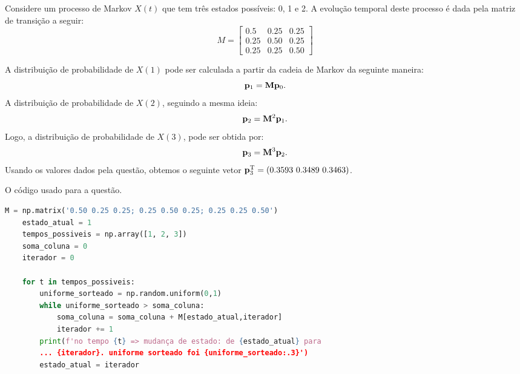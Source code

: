 \documentclass{homeworkclass}
\begin{document}
\begin{homeworkProblem}

Considere um processo de Markov $X(t)$ que tem três estados possíveis: 0, 1 e 2. A evolução temporal deste processo é dada pela matriz de transição a seguir:
\begin{equation*}
M = \begin{bmatrix}
0.5 & 0.25 & 0.25 \\
0.25 & 0.50 & 0.25 \\
0.25 & 0.25 & 0.50
\end{bmatrix}
\end{equation*}
\begin{homeworkSection}[a) Considerando que a distribuição de probabilidade de $X(0)$ é dada pelo vetor $\pbf_{0} = \left( 0.3 \, \, 0.4 \, \, 0.3 \right)^{\Trm}$, calcule a distribuição de probabilidade de $X(3)$ (ou seja, do processo de Markov no instante $t = 3$).]

A distribuição de probabilidade de $X(1)$ pode ser calculada a partir da cadeia de Markov da seguinte maneira:
\begin{equation*}
	\mathbf{p}_{1} = \mathbf{M} \mathbf{p}_{0}.
\end{equation*}
A distribuição de probabilidade de $X(2)$, seguindo a mesma ideia:
\begin{equation*}
	\mathbf{p}_{2} = \mathbf{M}^{2} \mathbf{p}_{1}.
\end{equation*}
Logo, a distribuição de probabilidade de $X(3)$, pode ser obtida por:
\begin{equation*}
	\mathbf{p}_{3} = \mathbf{M}^{3} \mathbf{p}_{2}.
\end{equation*}
Usando os valores dados pela questão, obtemos o seguinte vetor $\mathbf{p}_{3}^{\mathrm{T}} = \left( 0.3593 \, \, 0.3489 \, \, 0.3463 \right)$.
\end{homeworkSection}


\begin{homeworkSection}[b)Iniciando em $X(0) = 1$, e usando um gerador de números aleatórios (são necessários apenas três números aleatórios equiprováveis), calcule manualmente uma amostra do processo X(t) até $t = 3$.]

O código usado para a questão.
\begin{lstlisting}[language=Python]
	M = np.matrix('0.50 0.25 0.25; 0.25 0.50 0.25; 0.25 0.25 0.50')
	estado_atual = 1
	tempos_possiveis = np.array([1, 2, 3])
	soma_coluna = 0
	iterador = 0

	for t in tempos_possiveis:
		uniforme_sorteado = np.random.uniform(0,1)
		while uniforme_sorteado > soma_coluna:
			soma_coluna = soma_coluna + M[estado_atual,iterador]
			iterador += 1
		print(f'no tempo {t} => mudança de estado: de {estado_atual} para 
		... {iterador}. uniforme sorteado foi {uniforme_sorteado:.3}')
		estado_atual = iterador	
\end{lstlisting}


\end{homeworkSection}
\end{homeworkProblem}
\end{document}
